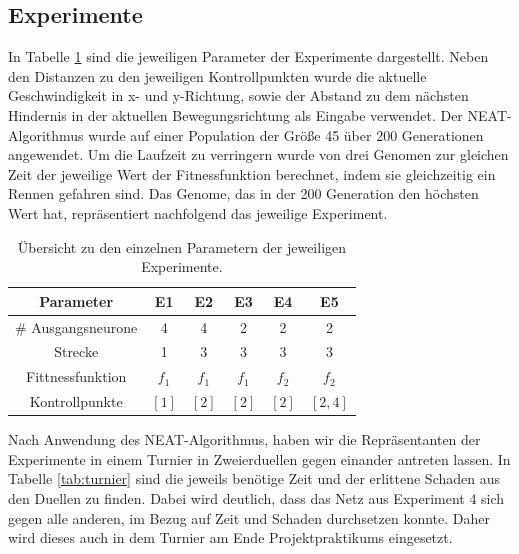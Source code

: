 \documentclass[11pt,final,journal,a4paper,towside,towcolumn]{IEEEtran}
\begin{document}
\subsection{Experimente}
In Tabelle \ref{tab:experimente} sind die jeweiligen Parameter der Experimente dargestellt. Neben den Distanzen zu den jeweiligen Kontrollpunkten wurde die aktuelle Geschwindigkeit in x- und y-Richtung, sowie der Abstand zu dem nächsten Hindernis in der aktuellen Bewegungsrichtung als Eingabe verwendet. Der \ac{NEAT}-Algorithmus wurde auf einer Population der Größe 45 über 200 Generationen angewendet. Um die Laufzeit zu verringern wurde von drei Genomen zur gleichen Zeit der jeweilige Wert der Fitnessfunktion berechnet, indem sie gleichzeitig ein Rennen gefahren sind. Das Genome, das in der 200 Generation den höchsten Wert hat, repräsentiert nachfolgend das jeweilige Experiment.

\begin{table}
	\setlength{}
	\caption{Übersicht zu den einzelnen Parametern der jeweiligen Experimente.}
	\label{tab:experimente}
	\centering
	\begin{tabular}{|c||c|c|c|c|c|}
		\hline
		Parameter & E1 & E2 & E3 & E4 & E5\\\hline\hline
		\# Ausgangsneurone & 4 & 4 & 2 & 2 & 2\\\hline
		Strecke & 1 & 3 & 3& 3 &3\\\hline
		Fittnessfunktion & $f_1$& $f_1$& $f_1$& $f_2$&$f_2$\\\hline
		Kontrollpunkte & $\left[1\right]$& $\left[2\right]$& $\left[2\right]$& $\left[2\right]$&$\left[2, 4\right]$\\\hline
	\end{tabular}
\end{table}

Nach Anwendung des \ac{NEAT}-Algorithmus, haben wir die Repräsentanten der Experimente in einem Turnier in Zweierduellen gegen einander antreten lassen. In Tabelle \ref{tab:turnier} sind die jeweils benötige Zeit und der erlittene Schaden aus den Duellen zu finden. Dabei wird deutlich, dass das Netz aus Experiment 4 sich gegen alle anderen, im Bezug auf Zeit und Schaden durchsetzen konnte. Daher wird dieses auch in dem Turnier am Ende Projektpraktikums eingesetzt.
\end{document}
